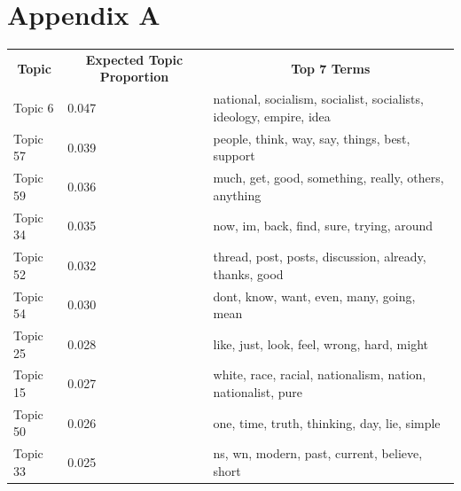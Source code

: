 \documentclass[12pt]{paper}
\begin{document}
\section*{Appendix A}
\begin{table}[H]
	\begin{adjustbox}{width=1\textwidth}
		\begin{tabular}{lll}
			\multicolumn{1}{c}{\textbf{Topic}} & \multicolumn{1}{c}{\textbf{Expected Topic Proportion}} & \multicolumn{1}{c}{\textbf{Top 7 Terms}}                            \\
			Topic 6                            & 0.047                                                  & national, socialism, socialist, socialists, ideology, empire, idea  \\
			Topic 57                           & 0.039                                                  & people, think, way, say, things, best, support                      \\
			Topic 59                           & 0.036                                                  & much, get, good, something, really, others, anything                \\
			Topic 34                           & 0.035                                                  & now, im, back, find, sure, trying, around                           \\
			Topic 52                           & 0.032                                                  & thread, post, posts, discussion, already, thanks, good              \\
			Topic 54                           & 0.030                                                  & dont, know, want, even, many, going, mean                           \\
			Topic 25                           & 0.028                                                  & like, just, look, feel, wrong, hard, might                          \\
			Topic 15                           & 0.027                                                  & white, race, racial, nationalism, nation, nationalist, pure         \\
			Topic 50                           & 0.026                                                  & one, time, truth, thinking, day, lie, simple                        \\
			Topic 33                           & 0.025                                                  & ns, wn, modern, past, current, believe, short                       \\

\end{tabular}
\end{adjustbox}
\end{table}
\end{document}
